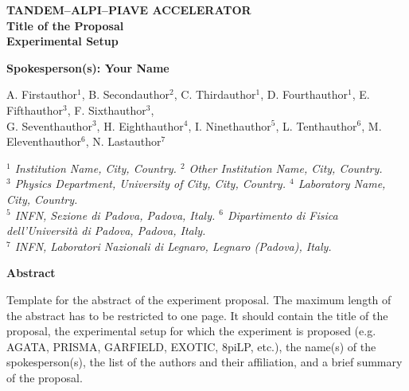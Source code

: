\documentclass[a4paper,12pt,tightenlines]{revtex4}
\begin{document}
\begin{center}
\begin{large}
{\bf TANDEM--ALPI--PIAVE ACCELERATOR}\\
\vspace{.4cm}
{\bf Title of the Proposal}\\ 
\vspace{.2cm}
{\bf Experimental Setup}
\end{large}
\vspace{.4cm}
\begin{flushleft}
{\bf Spokesperson(s): Your Name}
\end{flushleft}

A. Firstauthor$^1$, B. Secondauthor$^2$, C. Thirdauthor$^1$, D. Fourthauthor$^1$, E. Fifthauthor$^3$, F. Sixthauthor$^3$,\\
G. Seventhauthor$^3$, H. Eighthauthor$^4$, I. Ninethauthor$^5$, L. Tenthauthor$^6$, M. Eleventhauthor$^6$, N. Lastauthor$^7$
\vspace{.4cm}

\textit{\small
$^1$ Institution Name, City, Country. $^2$ Other Institution Name, City, Country.\\
$^3$ Physics Department, University of City, City, Country. $^4$ Laboratory Name, City, Country.\\
$^5$ INFN, Sezione di Padova, Padova, Italy. $^6$ Dipartimento di Fisica dell'Universit\`a di Padova, Padova, Italy.\\
$^7$ INFN, Laboratori Nazionali di Legnaro, Legnaro (Padova), Italy.
}
\end{center}
\vspace{0.65cm}

\thispagestyle{empty} 
\pagestyle{empty} 

\begin{center}
{\bf Abstract}
\end{center}

Template for the abstract of the experiment proposal. The maximum length of the abstract has to be 
restricted to one page. It should contain the title of the proposal, the experimental setup for
which the experiment is proposed (e.g. AGATA, PRISMA, GARFIELD, EXOTIC, 8piLP, etc.), the name(s)
of the spokesperson(s), the list of the authors and their affiliation, and a brief summary of the 
proposal.
\end{document}
